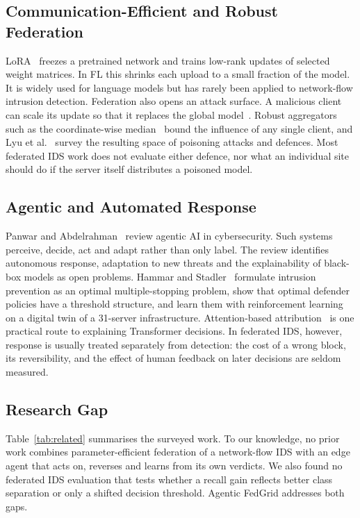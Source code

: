 \subsection{Communication-Efficient and Robust Federation}
LoRA~\cite{hu2022lora} freezes a pretrained network and trains low-rank
updates of selected weight matrices. In FL this shrinks each upload to a
small fraction of the model. It is widely used for language models but has
rarely been applied to network-flow intrusion detection. Federation also
opens an attack surface. A malicious client can scale its update so that it
replaces the global model~\cite{bagdasaryan2020}. Robust aggregators such as
the coordinate-wise median~\cite{yin2018} bound the influence of any single
client, and Lyu et al.~\cite{lyu2022} survey the resulting space of poisoning
attacks and defences. Most federated IDS work does not evaluate either
defence, nor what an individual site should do if the server itself
distributes a poisoned model.

\subsection{Agentic and Automated Response}
Panwar and Abdelrahman~\cite{panwar2025agentic} review agentic AI in
cybersecurity. Such systems perceive, decide, act and adapt rather than only
label. The review identifies autonomous response, adaptation to new threats
and the explainability of black-box models as open problems. Hammar and
Stadler~\cite{hammar2022} formulate intrusion prevention as an optimal
multiple-stopping problem, show that optimal defender policies have a
threshold structure, and learn them with reinforcement learning on a digital
twin of a 31-server infrastructure. Attention-based
attribution~\cite{abnar2020} is one practical route to explaining
Transformer decisions. In federated IDS, however, response is usually
treated separately from detection: the cost of a wrong block, its
reversibility, and the effect of human feedback on later decisions are
seldom measured.

\subsection{Research Gap}
Table~\ref{tab:related} summarises the surveyed work.
To our knowledge, no prior work combines parameter-efficient federation of a
network-flow IDS with an edge agent that acts on, reverses and learns from
its own verdicts. We also found no federated IDS evaluation that tests
whether a recall gain reflects better class separation or only a shifted
decision threshold. Agentic FedGrid addresses both gaps.

